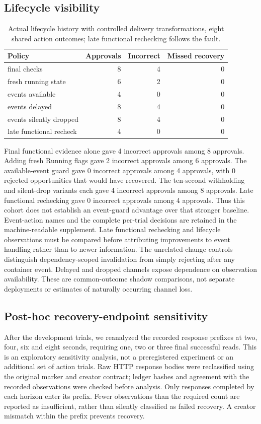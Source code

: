 \documentclass[manuscript,review,nonacm]{acmart}
\begin{document}
\subsection{Lifecycle visibility}
\begin{table}[t]
\caption{Actual lifecycle history with controlled delivery transformations, eight shared action outcomes; late functional rechecking follows the fault.}
\label{tab:policy-6-4}
\centering
\begin{tabularx}{\linewidth}{@{}Xrrr@{}}
\toprule
Policy & Approvals & Incorrect & Missed recovery \\
\midrule
final checks & 8 & 4 & 0 \\
fresh running state & 6 & 2 & 0 \\
events available & 4 & 0 & 0 \\
events delayed & 8 & 4 & 0 \\
events silently dropped & 8 & 4 & 0 \\
late functional recheck & 4 & 0 & 0 \\
\bottomrule
\end{tabularx}
\end{table}
Final functional evidence alone gave 4 incorrect approvals among 8 approvals. Adding fresh Running flags gave 2 incorrect approvals among 6 approvals. The available-event guard gave 0 incorrect approvals among 4 approvals, with 0 rejected opportunities that would have recovered. The ten-second withholding and silent-drop variants each gave 4 incorrect approvals among 8 approvals. Late functional rechecking gave 0 incorrect approvals among 4 approvals. Thus this cohort does not establish an event-guard advantage over that stronger baseline. Event-action names and the complete per-trial decisions are retained in the machine-readable supplement.
Late functional rechecking and lifecycle observations must be compared before attributing improvements to event handling rather than to newer information. The unrelated-change controls distinguish dependency-scoped invalidation from simply rejecting after any container event. Delayed and dropped channels expose dependence on observation availability. These are common-outcome shadow comparisons, not separate deployments or estimates of naturally occurring channel loss.

\subsection{Post-hoc recovery-endpoint sensitivity}
After the development trials, we reanalyzed the recorded response prefixes at two, four, six and eight seconds, requiring one, two or three final successful reads. This is an exploratory sensitivity analysis, not a preregistered experiment or an additional set of action trials. Raw HTTP response bodies were reclassified using the original marker and creator contract; ledger hashes and agreement with the recorded observations were checked before analysis. Only responses completed by each horizon enter its prefix. Fewer observations than the required count are reported as insufficient, rather than silently classified as failed recovery. A creator mismatch within the prefix prevents recovery.
\end{document}
